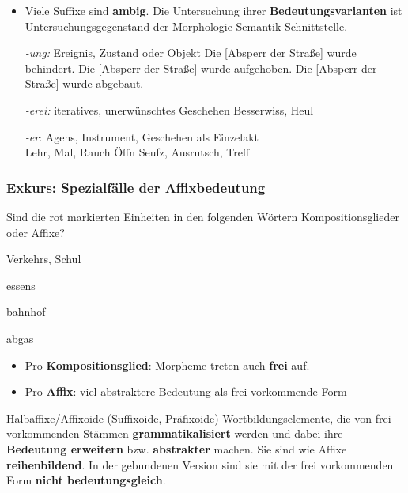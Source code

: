 \begin{frame}

\begin{itemize}
\item Viele Suffixe sind \textbf{ambig}. Die Untersuchung ihrer \textbf{Bedeutungsvarianten} ist Untersuchungsgegenstand der Morphologie-Semantik-Schnittstelle.

\ea \emph{-ung:} Ereignis, Zustand oder Objekt 
\ea Die [Absperr der Straße] wurde behindert.
\ex Die [Absperr der Straße] wurde aufgehoben.
\ex Die [Absperr der Straße] wurde abgebaut.
\z 

\ex \emph{-erei:} iteratives, unerwünschtes Geschehen
\ea Besserwiss, Heul
\z

\ex \emph{-er}: Agens, Instrument, Geschehen als Einzelakt\\
\hfill {}
\ea Lehr, Mal, Rauch
\ex Öffn	
\ex Seufz, Ausrutsch, Treff %
\z 
\z 
\end{itemize}

\end{frame}


\begin{frame}
\frametitle{Exkurs: Spezialfälle der Affixbedeutung}


Sind die rot markierten Einheiten in den folgenden Wörtern Kompositionsglieder oder Affixe? 

\eal 
\ex Verkehrs, Schul

\ex essens


\ex {}bahnhof

\ex abgas
\zl

\pause

\begin{itemize}
\item Pro \textbf{Kompositionsglied}: Morpheme treten auch \textbf{frei} auf.

\item Pro \textbf{Affix}: viel abstraktere Bedeutung als frei vorkommende Form
\end{itemize}

\begin{block}{Halbaffixe/Affixoide (Suffixoide, Präfixoide)}
Wortbildungselemente, die von frei vorkommenden Stämmen \textbf{grammatikalisiert} werden und dabei ihre \textbf{Bedeutung erweitern} bzw. \textbf{abstrakter} machen. Sie sind wie Affixe \textbf{reihenbildend}. In der gebundenen Version sind sie mit der frei vorkommenden Form \textbf{nicht bedeutungsgleich}.
\end{block}

\end{frame}


